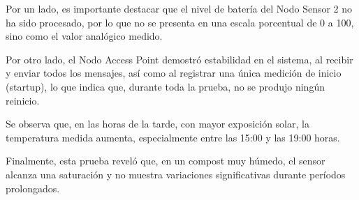 Por un lado, es importante destacar que el nivel de batería del Nodo Sensor 2 no ha sido procesado, por lo que no se presenta en una escala porcentual de 0 a 100, sino como el valor analógico medido.

Por otro lado, el Nodo Access Point demostró estabilidad en el sistema, al recibir y enviar todos los mensajes, así como al registrar una única medición de inicio (startup), lo que indica que, durante toda la prueba, no se produjo ningún reinicio.

Se observa que, en las horas de la tarde, con mayor exposición solar, la temperatura medida aumenta, especialmente entre las 15:00 y las 19:00 horas.

Finalmente, esta prueba reveló que, en un compost muy húmedo, el sensor alcanza una saturación y no muestra variaciones significativas durante períodos prolongados.

